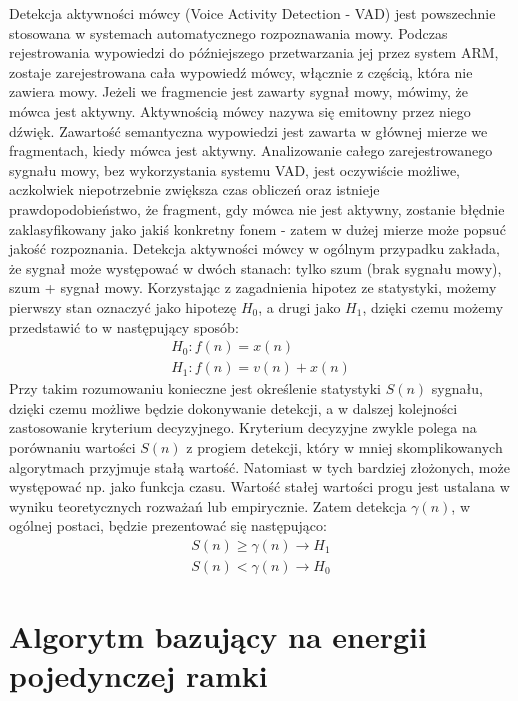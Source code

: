\documentclass[eng,printmode]{mgr}
\begin{document}
 Detekcja aktywności mówcy (Voice Activity Detection - VAD) jest powszechnie stosowana w systemach automatycznego rozpoznawania mowy. Podczas rejestrowania wypowiedzi do późniejszego przetwarzania jej przez system ARM, zostaje zarejestrowana cała wypowiedź mówcy, włącznie z częścią, która nie zawiera mowy. Jeżeli we fragmencie jest zawarty sygnał mowy, mówimy, że mówca jest aktywny. Aktywnością mówcy nazywa się emitowny przez niego dźwięk.  Zawartość semantyczna wypowiedzi jest zawarta w głównej mierze we fragmentach, kiedy mówca jest aktywny. Analizowanie całego  zarejestrowanego sygnału mowy, bez wykorzystania systemu VAD, jest oczywiście możliwe, aczkolwiek niepotrzebnie zwiększa czas obliczeń oraz istnieje prawdopodobieństwo, że fragment, gdy mówca nie jest aktywny, zostanie błędnie zaklasyfikowany jako jakiś konkretny fonem - zatem w dużej mierze może popsuć jakość rozpoznania. Detekcja aktywności mówcy w ogólnym przypadku zakłada, że sygnał może występować w dwóch stanach: tylko szum (brak sygnału mowy), szum + sygnał mowy. Korzystając z zagadnienia hipotez ze statystyki, możemy pierwszy stan oznaczyć jako hipotezę $H_{0}$, a drugi jako $H_{1}$, dzięki czemu możemy przedstawić to w następujący sposób:
 \begin{equation}
  \begin{array}{c}
	  H_{0}: f(n)=x(n)\\
	  H_{1}: f(n)=v(n)+x(n)
  \end{array} 	 
 \end{equation}
  Przy takim rozumowaniu konieczne jest określenie statystyki $S(n)$ sygnału, dzięki czemu możliwe będzie dokonywanie detekcji, a w dalszej kolejności zastosowanie kryterium decyzyjnego. Kryterium decyzyjne zwykle polega na porównaniu wartości $S(n)$ z progiem detekcji, który w mniej skomplikowanych algorytmach przyjmuje stałą wartość. Natomiast w tych bardziej złożonych, może występować np. jako funkcja czasu. Wartość stałej wartości progu jest ustalana w wyniku teoretycznych rozważań lub empirycznie. Zatem detekcja $\gamma(n)$, w ogólnej postaci, będzie prezentować się następująco:
   \begin{equation}
   \begin{array}{c}
	   S(n)\geq\gamma(n)\to H_{1}\\
	   S(n)<\gamma(n)\to H_{0}
   \end{array} 	 
   \end{equation}
 
	 
 \section{Algorytm bazujący na energii pojedynczej ramki}
\end{document}
